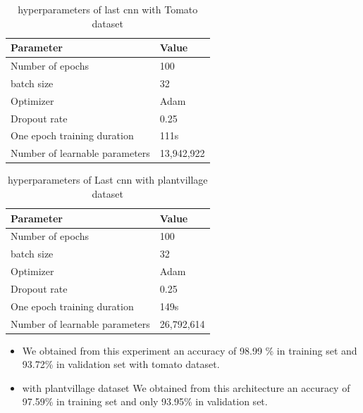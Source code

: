 \begin{table}[H]
\begin{tabular}{@{}|p{9cm}|p{3cm}|@{}}
\hline
 \centering \textbf{Parameter} & \textbf{Value}  \\ \hline
 Number of epochs & 100  \\  \hline
 batch size & 32 \\ \hline
 Optimizer & Adam \\ \hline
 Dropout rate & 0.25 \\ \hline
 One epoch training duration & 111s \\ \hline
 Number of learnable parameters & 13,942,922 \\ \hline
\end{tabular}
\caption{hyperparameters of last cnn with Tomato dataset}
\end{table}

\begin{table}[H]
\begin{tabular}{@{}|p{9cm}|p{3cm}|@{}}
\hline
 \centering \textbf{Parameter} & \textbf{Value}  \\ \hline
 Number of epochs & 100  \\  \hline
 batch size & 32 \\ \hline
 Optimizer & Adam \\ \hline
 Dropout rate & 0.25 \\ \hline
 One epoch training duration & 149s \\ \hline
 Number of learnable parameters & 26,792,614 \\ \hline
\end{tabular}
\caption{hyperparameters of Last cnn with plantvillage dataset}
\end{table}
\begin{itemize}
    \item We obtained from this experiment an accuracy of 98.99 \% in training set and 93.72\% in validation set with tomato dataset.
    \item with plantvillage dataset We obtained from this architecture an accuracy of 97.59\% in training set and only 93.95\% in validation set.
\end{itemize}
